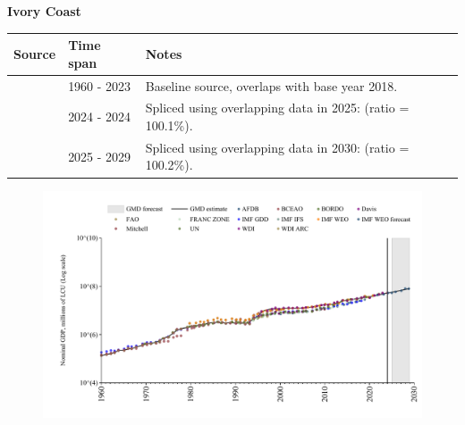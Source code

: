 \documentclass[12pt,a4paper,landscape]{article}
\begin{document}
\begin{adjustbox}{max totalsize={\paperwidth}{\paperheight},center}
\begin{minipage}[t][\textheight][t]{\textwidth}
\vspace*{0.5cm}
{}
\begin{center}
{\Large\bfseries Ivory Coast}
\end{center}
\vspace{0.5cm}
\begin{table}[H]
\centering
\small
\begin{tabular}{|l|l|l|}
\hline
\textbf{Source} & \textbf{Time span} & \textbf{Notes} \\
\hline
\rowcolor{white}\cite{WDI}& 1960 - 2023 &Baseline source, overlaps with base year 2018.\\
\rowcolor{lightgray}\cite{BCEAO}& 2024 - 2024 &Spliced using overlapping data in 2025: (ratio = 100.1\%).\\
\rowcolor{white}\cite{IMF_WEO_forecast}& 2025 - 2029 &Spliced using overlapping data in 2030: (ratio = 100.2\%).\\
\hline
\end{tabular}
\end{table}
\begin{figure}[H]
\centering
\includegraphics[width=\textwidth,height=0.6\textheight,keepaspectratio]{graphs/CIV_nGDP.pdf}
\end{figure}
\end{minipage}
\end{adjustbox}
\end{document}
